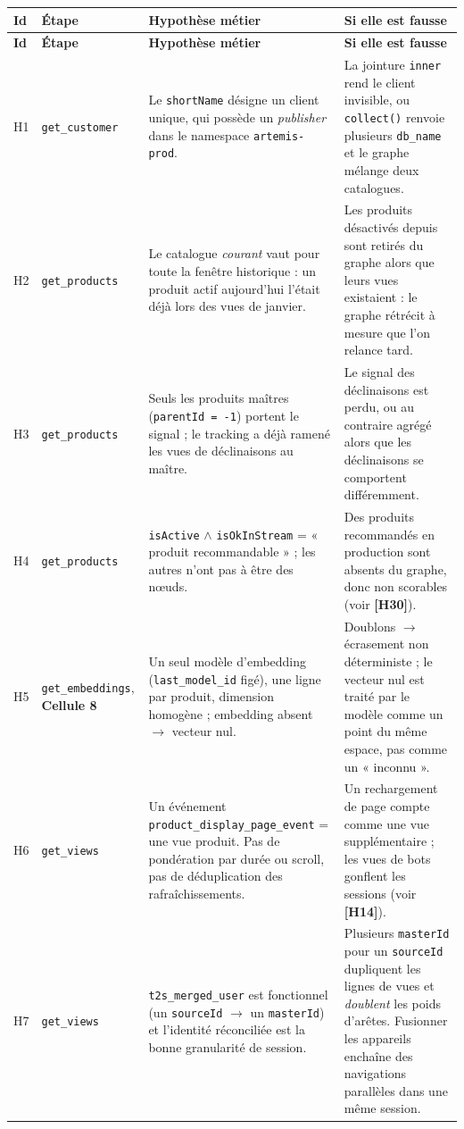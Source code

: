 \documentclass[11pt,a4paper]{article}
\newcommand{\code}[1]{\texttt{\small #1}}
\newcommand{\hyp}[1]{\textcolor{hypcol}{\textbf{\small [#1]}}}
\newcommand{\cell}[1]{\textbf{Cellule #1}}
\begin{document}
{\small
\begin{longtable}{@{}l p{2.45cm} p{5.9cm} p{4.5cm}@{}}
\toprule
\textbf{Id} & \textbf{Étape} & \textbf{Hypothèse métier} & \textbf{Si elle est fausse} \\
\midrule
\endfirsthead
\toprule
\textbf{Id} & \textbf{Étape} & \textbf{Hypothèse métier} & \textbf{Si elle est fausse} \\
\midrule
\endhead
\bottomrule
\endfoot

H1 & \code{get\_customer} & Le \code{shortName} désigne un client unique, qui possède un \emph{publisher} dans le namespace \code{artemis-prod}. & La jointure \code{inner} rend le client invisible, ou \code{collect()} renvoie plusieurs \code{db\_name} et le graphe mélange deux catalogues. \\
\addlinespace
H2 & \code{get\_products} & Le catalogue \emph{courant} vaut pour toute la fenêtre historique : un produit actif aujourd'hui l'était déjà lors des vues de janvier. & Les produits désactivés depuis sont retirés du graphe alors que leurs vues existaient : le graphe rétrécit à mesure que l'on relance tard. \\
\addlinespace
H3 & \code{get\_products} & Seuls les produits maîtres (\code{parentId = -1}) portent le signal ; le tracking a déjà ramené les vues de déclinaisons au maître. & Le signal des déclinaisons est perdu, ou au contraire agrégé alors que les déclinaisons se comportent différemment. \\
\addlinespace
H4 & \code{get\_products} & \code{isActive} $\land$ \code{isOkInStream} = « produit recommandable » ; les autres n'ont pas à être des nœuds. & Des produits recommandés en production sont absents du graphe, donc non scorables (voir \hyp{H30}). \\
\addlinespace
H5 & \code{get\_embeddings}, \cell{8} & Un seul modèle d'embedding (\code{last\_model\_id} figé), une ligne par produit, dimension homogène ; embedding absent $\rightarrow$ vecteur nul. & Doublons $\rightarrow$ écrasement non déterministe ; le vecteur nul est traité par le modèle comme un point du même espace, pas comme un « inconnu ». \\
\addlinespace
H6 & \code{get\_views} & Un événement \code{product\_display\_page\_event} = une vue produit. Pas de pondération par durée ou scroll, pas de déduplication des rafraîchissements. & Un rechargement de page compte comme une vue supplémentaire ; les vues de bots gonflent les sessions (voir \hyp{H14}). \\
\addlinespace
H7 & \code{get\_views} & \code{t2s\_merged\_user} est fonctionnel (un \code{sourceId} $\rightarrow$ un \code{masterId}) et l'identité réconciliée est la bonne granularité de session. & Plusieurs \code{masterId} pour un \code{sourceId} dupliquent les lignes de vues et \emph{doublent} les poids d'arêtes. Fusionner les appareils enchaîne des navigations parallèles dans une même session. \\

\end{longtable}}
\end{document}
